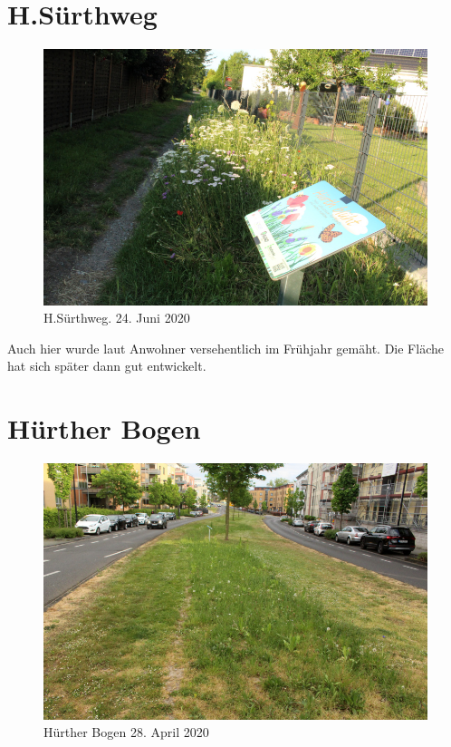 \documentclass[11pt]{article}
\begin{document}
\section{H.Sürthweg}
\begin{figure}[h!]
  \includegraphics[width=\linewidth]{img/suerthweg/juni.jpg}
  \caption{H.Sürthweg. 24. Juni 2020}
\end{figure}

Auch hier wurde laut Anwohner versehentlich im Frühjahr gemäht.
Die Fläche hat sich später dann gut entwickelt. 

\clearpage
\section{Hürther Bogen}
\begin{figure}[h!]
  \includegraphics[width=0.95\linewidth]{img/bogen/april.jpg}
  \caption{Hürther Bogen 28. April 2020}
\end{figure}
\end{document}

